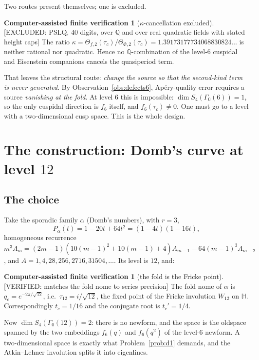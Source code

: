 \documentclass[11pt,reqno]{amsart}
\theoremstyle{plain}
\theoremstyle{definition}
\newtheorem{verification}[theorem]{Computer-assisted finite verification}
\theoremstyle{remark}
\newcommand{\Q}{\mathbb{Q}}
\newcommand{\HH}{\mathbb{H}}
\newcommand{\VerifiedR}[1]{\textup{\textsf{[VERIFIED: #1]}}}
\newcommand{\ExcludedR}[1]{\textup{\textsf{[EXCLUDED: #1]}}}
\begin{document}
Two routes present themselves; one is excluded.

\begin{verification}[$\kappa$-cancellation excluded]\label{ver:kappa}
\ExcludedR{PSLQ, $40$ digits, over $\Q$ and over real quadratic fields with
stated height caps}
The ratio $\kappa=\Theta_{f,2}(\tau_c)/\Theta_{\Phi,2}(\tau_c)
=1.39173177734068830824\ldots$ is neither rational nor quadratic. Hence no
$\Q$-combination of the level-$6$ cuspidal and Eisenstein companions
cancels the quasiperiod term.
\end{verification}

That leaves the structural route: \emph{change the source so that the
second-kind term is never generated}. By Observation~\ref{obs:defects6},
Ap\'ery-quality error requires a source \emph{vanishing at the fold}. At
level $6$ this is impossible: $\dim S_4(\Gamma_0(6))=1$, so the only
cuspidal direction is $f_6$ itself, and $f_6(\tau_c)\ne0$. One must go to a
level with a two-dimensional cusp space. This is the whole design.

\section{The construction: Domb's curve at level $12$}\label{sec:level12}

\subsection{The choice}
Take the sporadic family $\alpha$ (Domb's numbers), with $r=3$,
\[
P_\alpha(t)=1-20t+64t^2=(1-4t)(1-16t),
\]
homogeneous recurrence
$m^3A_m=(2m-1)(10(m-1)^2+10(m-1)+4)A_{m-1}-64(m-1)^3A_{m-2}$, and
$A=1,4,28,256,2716,31504,\dots$. Its level is $12$, and:

\begin{verification}[the fold is the Fricke point]\label{ver:fold12}
\VerifiedR{matches the fold nome to series precision}
The fold nome of $\alpha$ is $q_c=e^{-2\pi/\sqrt{12}}$, i.e.\
$\tau_{12}=i/\sqrt{12}$, the fixed point of the Fricke involution $W_{12}$
on $\HH$. Correspondingly $t_c=1/16$ and the conjugate root is
$t_c'=1/4$.
\end{verification}

Now $\dim S_4(\Gamma_0(12))=2$: there is no newform, and the space is the
oldspace spanned by the two embeddings $f_6(q)$ and $f_6(q^2)$ of the
level-$6$ newform. A two-dimensional space is exactly what
Problem~\ref{prob:d1} demands, and the Atkin--Lehner involution splits it
into eigenlines.
\end{document}
